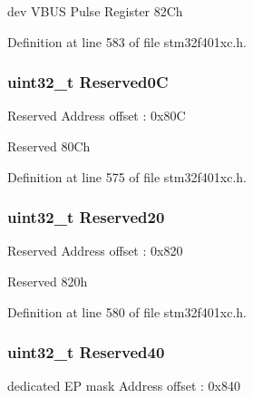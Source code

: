 dev V\+B\+US Pulse Register 82\+Ch 

Definition at line 583 of file stm32f401xc.\+h.

\subsubsection[{\texorpdfstring{Reserved0C}{Reserved0C}}]{\setlength{\rightskip}{0pt plus 5cm}uint32\+\_\+t Reserved0C}\hypertarget{struct_u_s_b___o_t_g___device_type_def_a1bcc039378b4ed4ac1261a0a758c3d1d}{}\label{struct_u_s_b___o_t_g___device_type_def_a1bcc039378b4ed4ac1261a0a758c3d1d}
Reserved Address offset \+: 0x80C

Reserved 80\+Ch 

Definition at line 575 of file stm32f401xc.\+h.

\subsubsection[{\texorpdfstring{Reserved20}{Reserved20}}]{\setlength{\rightskip}{0pt plus 5cm}uint32\+\_\+t Reserved20}\hypertarget{struct_u_s_b___o_t_g___device_type_def_a17d14644b0d28710722b1c2c0149e472}{}\label{struct_u_s_b___o_t_g___device_type_def_a17d14644b0d28710722b1c2c0149e472}
Reserved Address offset \+: 0x820

Reserved 820h 

Definition at line 580 of file stm32f401xc.\+h.

\subsubsection[{\texorpdfstring{Reserved40}{Reserved40}}]{\setlength{\rightskip}{0pt plus 5cm}uint32\+\_\+t Reserved40}\hypertarget{struct_u_s_b___o_t_g___device_type_def_a9e0c029846e94bf08ac8edb35b30ecb2}{}\label{struct_u_s_b___o_t_g___device_type_def_a9e0c029846e94bf08ac8edb35b30ecb2}
dedicated EP mask Address offset \+: 0x840


